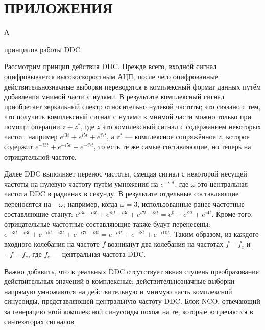 \documentclass{report}
\begin{document}

\chapter*{ПРИЛОЖЕНИЯ}

\begin{flushright}
     А
\end{flushright}

\begin{center}   принципов работы DDC \end{center}

Рассмотрим принцип действия DDC. Прежде всего, входной сигнал оцифровывается высокоскоростным АЦП, после чего оцифрованные действительнозначные выборки переводятся в комплексный формат данных путём добавления мнимой части с нулями. В результате комплексный сигнал приобретает зеркальный спектр относительно нулевой частоты; это связано с тем, что получить комплексный сигнал с нулями в мнимой части можно только при помощи операции $z + z^*$, где $z$ это комплексный сигнал с содержанием некоторых частот, например $e^{i3t} + e^{i5t} + e^{i7t}$, а $z^*$ --- комплексное сопряжённое $z$, которое содержит $e^{-i3t} + e^{-i5t} + e^{-i7t}$, то есть те же самые составляющие, но теперь на отрицательной частоте.

Далее DDC выполняет перенос частоты, смещая сигнал с некоторой несущей частоты на нулевую частоту путём умножения на $e^{-i \omega t}$, где $\omega$ это центральная частота DDC в радианах в секунду. В результате отдельные составляющие переносятся на $-\omega$; например, когда $\omega=3$, использованные ранее частотные составляющие станут: $e^{i3t - i3t} + e^{i5t - i3t} + e^{i7t - i3t} = e^{0} + e^{i2t} + e^{i4t}$. Кроме того, отрицательные частотные составляющие также будут перенесены: $e^{-i3t - i3t} + e^{-i5t - i3t} + e^{-i7t - i3t} = e^{-i6t} + e^{-i8t} + e^{-i10t}$. Таким образом, из каждого входного колебания на частоте $f$ возникнут два колебания на частотах $f - f_c$ и $-f -f_c$, где $f_c$ --- центральная частота DDC.

Важно добавить, что в реальных DDC отсутствует явная ступень преобразования действительных значений в комплексные; действительнозначные выборки напрямую умножаются на действительную и мнимую часть комплексной синусоиды, представляющей центральную частоту DDC. Блок NCO, отвечающий за генерацию этой комплексной синусоиды похож на те, которые встречаются в синтезаторах сигналов.
\end{document}
